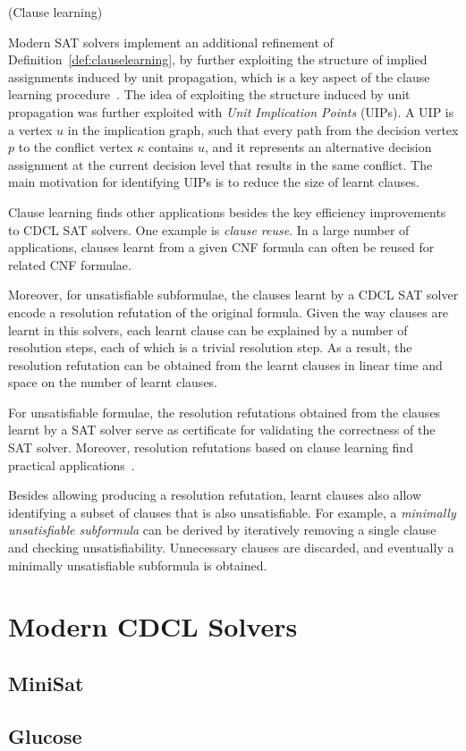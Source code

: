 \begin{example}%
\label{ex:cl}
    (Clause learning)
\end{example}

Modern SAT solvers implement an additional refinement of
Definition~\ref{def:clauselearning}, by further exploiting the structure of
implied assignments induced by unit propagation, which is a key aspect of the
clause learning procedure~\cite{silva1997grasp}. The idea of exploiting the
structure induced by unit propagation was further exploited with \emph{Unit
Implication Points} (UIPs). A UIP is a vertex $u$ in the implication graph, such
that every path from the decision vertex $p$ to the conflict vertex $\kappa$
contains $u$, and it represents an alternative decision assignment at the
current decision level that results in the same conflict. The main motivation
for identifying UIPs is to reduce the size of learnt clauses. 

Clause learning finds other applications besides the key efficiency improvements
to CDCL SAT solvers. One example is \emph{clause reuse}. In a large number of
applications, clauses learnt from a given CNF formula can often be reused for
related CNF formulae. 

Moreover, for unsatisfiable subformulae, the clauses learnt by a CDCL SAT solver
encode a resolution refutation of the original formula. Given the way clauses
are learnt in this solvers, each learnt clause can be explained by a number of
resolution steps, each of which is a trivial resolution step. As a result, the
resolution refutation can be obtained from the learnt clauses in linear time and
space on the number of learnt clauses. 

For unsatisfiable formulae, the resolution refutations obtained from the clauses
learnt by a SAT solver serve as certificate for validating the correctness of
the SAT solver. Moreover, resolution refutations based on clause learning find
practical applications~\cite{cdclchapter}.

Besides allowing producing a resolution refutation, learnt clauses also allow
identifying a subset of clauses that is also unsatisfiable. For example, a
\emph{minimally unsatisfiable subformula} can be derived by iteratively removing
a single clause and checking unsatisfiability. Unnecessary clauses are
discarded, and eventually a minimally unsatisfiable subformula is obtained.

\section{Modern CDCL Solvers}%
\label{sec:minisat}

\subsection{MiniSat}

\subsection{Glucose}
